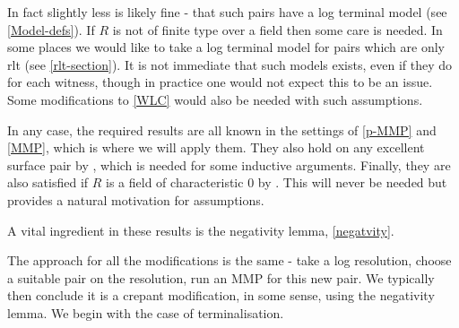 In fact slightly less is likely fine - that such pairs have a log terminal model (see \autoref{Model-defs}). If $R$ is not of finite type over a field then some care is needed. In some places we would like to take a log terminal model for pairs which are only rlt (see \autoref{rlt-section}). It is not immediate that such models exists, even if they do for each witness, though in practice one would not expect this to be an issue. Some modifications to \autoref{WLC} would also be needed with such assumptions.

In any case, the required results are all known in the settings of \autoref{p-MMP} and \autoref{MMP}, which is where we will apply them. They also hold on any excellent surface pair by \cite{tanaka2018minimal}, which is needed for some inductive arguments. Finally, they are also satisfied if $R$ is a field of characteristic $0$ by \cite{BCHM10}. This will never be needed but provides a natural motivation for assumptions.

A vital ingredient in these results is the negativity lemma, \autoref{negatvity}.

The approach for all the modifications is the same - take a log resolution, choose a suitable pair on the resolution, run an MMP for this new pair. We typically then conclude it is a crepant modification, in some sense, using the negativity lemma. We begin with the case of terminalisation.

%	
%	



%	
%	
%

